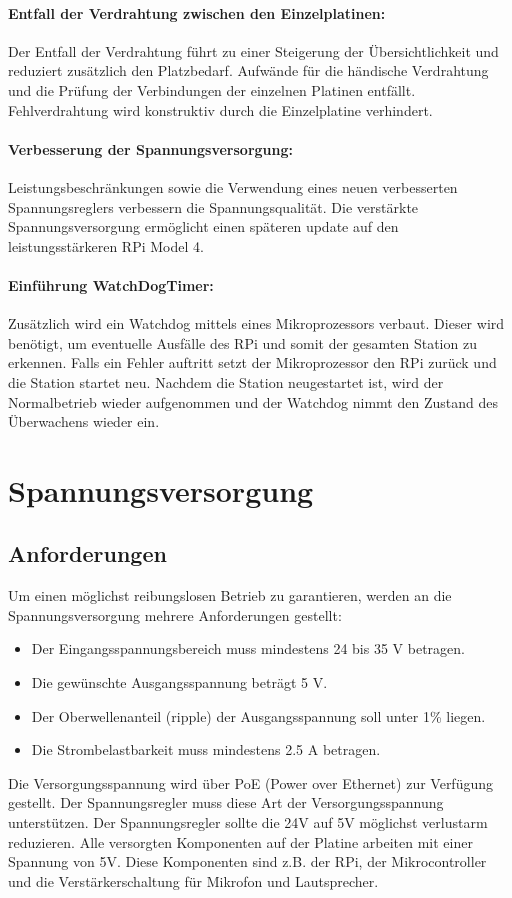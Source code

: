 \documentclass[a4paper, twoside, 12pt, openright]{memoir}
\begin{document}
\paragraph{Entfall der Verdrahtung zwischen den Einzelplatinen:}
Der Entfall der Verdrahtung führt zu einer Steigerung der Übersichtlichkeit und reduziert zusätzlich den Platzbedarf.
Aufwände für die händische Verdrahtung und die Prüfung der Verbindungen der einzelnen Platinen entfällt.
Fehlverdrahtung wird konstruktiv durch die Einzelplatine verhindert.

\paragraph{Verbesserung der Spannungsversorgung:}
Leistungsbeschränkungen sowie die Verwendung eines neuen verbesserten Spannungsreglers verbessern die Spannungsqualität.
Die verstärkte Spannungsversorgung ermöglicht einen späteren update auf den leistungsstärkeren RPi Model 4.

\paragraph{Einführung WatchDogTimer:}
Zusätzlich wird ein Watchdog mittels eines Mikroprozessors verbaut.
Dieser wird benötigt, um eventuelle Ausfälle des RPi und somit der gesamten Station zu erkennen.
Falls ein Fehler auftritt setzt der Mikroprozessor den RPi zurück und die Station startet neu.
Nachdem die Station neugestartet ist, wird der Normalbetrieb wieder aufgenommen und der Watchdog nimmt den Zustand des Überwachens wieder ein.

\section{Spannungsversorgung}
\subsection{Anforderungen}
Um einen möglichst reibungslosen Betrieb zu garantieren, werden an die Spannungsversorgung mehrere Anforderungen gestellt:
\begin{itemize}
	\item Der Eingangsspannungsbereich muss mindestens 24 bis 35 V betragen.
	\item Die gewünschte Ausgangsspannung beträgt 5 V.
	\item Der Oberwellenanteil (ripple) der Ausgangsspannung soll unter 1\% liegen. 
	\item Die Strombelastbarkeit muss mindestens 2.5 A betragen.
\end{itemize}
Die Versorgungsspannung wird über PoE (Power over Ethernet) zur Verfügung gestellt.
Der Spannungsregler muss diese Art der Versorgungsspannung unterstützen.
Der Spannungsregler sollte die 24V auf 5V möglichst verlustarm reduzieren.
Alle versorgten Komponenten auf der Platine arbeiten mit einer Spannung von 5V.
Diese Komponenten sind z.B. der RPi, der Mikrocontroller und die Verstärkerschaltung für Mikrofon und Lautsprecher.\par
\end{document}
